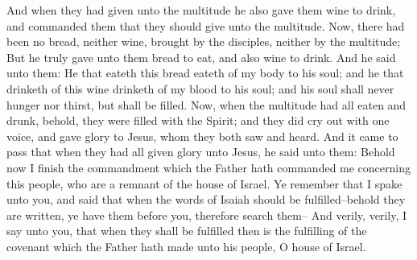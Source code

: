 And when they had given unto the multitude he also gave them wine to drink, and commanded them that they should give unto the multitude.
\bverse \iffalse Now, there had been no bread, neither wine, brought by the disciples, neither by the multitude; \fi
Now, there had been no bread, neither wine, brought by the disciples, neither by the multitude;
\bverse \iffalse But he truly gave unto them bread to eat, and also wine to drink. \fi
But he truly gave unto them bread to eat, and also wine to drink.
\bverse \iffalse And he said unto them: He that eateth this bread eateth of my body to his soul; and he that drinketh of this wine drinketh of my blood to his soul; and his soul shall never hunger nor thirst, but shall be filled. \fi
And he said unto them: He that eateth this bread eateth of my body to his soul; and he that drinketh of this wine drinketh of my blood to his soul; and his soul shall never hunger nor thirst, but shall be filled.
\bverse \iffalse Now, when the multitude had all eaten and drunk, behold, they were filled with the Spirit; and they did cry out with one voice, and gave glory to Jesus, whom they both saw and heard. \fi
Now, when the multitude had all eaten and drunk, behold, they were filled with the Spirit; and they did cry out with one voice, and gave glory to Jesus, whom they both saw and heard.
\bverse \iffalse And it came to pass that when they had all given glory unto Jesus, he said unto them: Behold now I finish the commandment which the Father hath commanded me concerning this people, who are a remnant of the house of Israel. \fi
And it came to pass that when they had all given glory unto Jesus, he said unto them: Behold now I finish the commandment which the Father hath commanded me concerning this people, who are a remnant of the house of Israel.
\bverse \iffalse Ye remember that I spake unto you, and said that when the words of Isaiah should be fulfilled--behold they are written, ye have them before you, therefore search them-- \fi
Ye remember that I spake unto you, and said that when the words of Isaiah should be fulfilled--behold they are written, ye have them before you, therefore search them--
\bverse \iffalse And verily, verily, I say unto you, that when they shall be fulfilled then is the fulfilling of the covenant which the Father hath made unto his people, O house of Israel. \fi
And verily, verily, I say unto you, that when they shall be fulfilled then is the fulfilling of the covenant which the Father hath made unto his people, O house of Israel.
